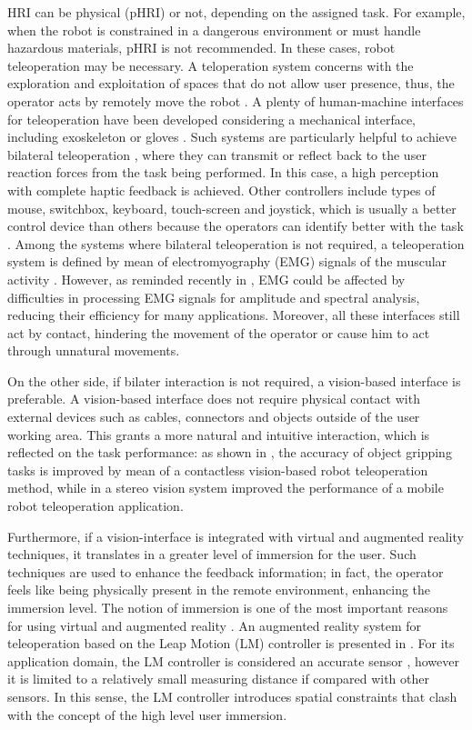 \documentclass[a4paper, 10pt, conference]{ieeeconf}      %
\begin{document}
HRI can be physical (pHRI) or not, depending on the assigned task. For example, when the robot is constrained in a dangerous environment or must handle hazardous materials, pHRI is not recommended. In these cases, robot teleoperation may be necessary. A teloperation system concerns with the exploration and exploitation of spaces that do not allow user presence, thus, the operator acts by remotely move the robot \cite{VERTUTJean}. A plenty of human-machine interfaces for teleoperation have been developed considering a mechanical interface, including exoskeleton \cite{Rebelo2014} or gloves \cite{Lv2006}. Such systems are particularly helpful to achieve bilateral teleoperation \cite{Hokayem2006}, where they can transmit or reflect back to the user reaction forces from the task being performed. In this case, a high perception with complete haptic feedback \cite{Glover2009} is achieved. Other controllers include types of mouse, switchbox, keyboard, touch-screen and joystick, which is usually a better control device than others because the operators can identify better with the task \cite{Boboc2012}. Among the systems where bilateral teleoperation is not required, a teleoperation system is defined by mean of electromyography (EMG) signals of the muscular activity \cite{Vogel2011, Hassan2019}. However, as reminded recently in \cite{Roveda2018a}, EMG could be affected by difficulties in processing EMG signals for amplitude and spectral analysis, reducing their efficiency for many applications. Moreover, all these interfaces still act by contact, hindering the movement of the operator or cause him to act through unnatural movements.

On the other side, if bilater interaction is not required, a vision-based interface is preferable. A vision-based interface does not require physical contact with external devices such as cables, connectors and objects outside of the user working area. This grants a more natural and intuitive interaction, which is reflected on the task performance: as shown in \cite{Kofman2005}, the accuracy of object gripping tasks is improved by mean of a contactless vision-based robot teleoperation method, while in \cite{Livatino2009} a stereo vision system improved the performance of a mobile robot teleoperation application.

Furthermore, if a vision-interface is integrated with virtual and augmented reality techniques, it translates in a greater level of immersion for the user. Such techniques are used to enhance the feedback information; in fact, the operator feels like being physically present in the remote environment, enhancing the immersion level. The notion of immersion is one of the most important reasons for using virtual and augmented reality \cite{Boboc2012}. An augmented reality system for teleoperation based on the Leap Motion (LM) controller is presented in \cite{Peppoloni2015}. For its application domain, the LM controller is considered an accurate sensor \cite{Hedayati2018}, however it is limited to a relatively small measuring distance if compared with other sensors. In this sense, the LM controller introduces spatial constraints that clash with the concept of the high level user immersion.
\end{document}
